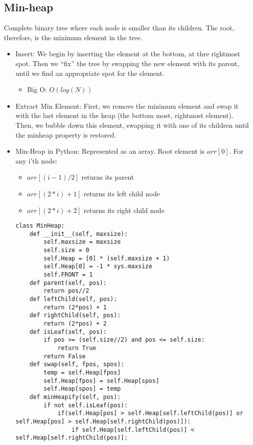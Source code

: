 \documentclass[a4paper, 11.25pt]{article}
\begin{document}
\subsection{Min-heap}
Complete binary tree where each node is smaller than its children. The root, therefore, is the minimum element in the tree. 
\begin{itemize}
    \item Insert: We begin by inserting the element at the bottom, at thre rightmost spot. Then we ``fix'' the tree by swapping the new element with its parent, until we find an appropriate spot for the element.
    \begin{itemize}
        \item Big O: $O(log(N))$
    \end{itemize}
    \item Extract Min Element: First, we remove the minimum element and swap it with the last element in the heap (the bottom most, rightmost element). Then, we bubble down this element, swapping it with one of its children until the minheap property is restored.
    \item Min-Heap in Python: Represented as an array. Root element is $arr[0]$. For any i'th node:
    \begin{itemize}
        \item $arr[(i-1)/2]$ returns its parent
        \item $arr[(2*i)+1]$ returns its left child node
        \item $arr[(2*i)+2]$ returns its right child node
    \end{itemize}
    \begin{lstlisting}[style=PythonStyle]
class MinHeap:
    def __init__(self, maxsize):
        self.maxsize = maxsize
        self.size = 0
        self.Heap = [0] * (self.maxsize + 1)
        self.Heap[0] = -1 * sys.maxsize
        self.FRONT = 1
    def parent(self, pos):
        return pos//2
    def leftChild(self, pos):
        return (2*pos) + 1
    def rightChild(self, pos):
        return (2*pos) + 2
    def isLeaf(self, pos):
        if pos >= (self.size//2) and pos <= self.size:
            return True
        return False
    def swap(self, fpos, spos):
        temp = self.Heap[fpos]
        self.Heap[fpos] = self.Heap[spos]
        self.Heap[spos] = temp
    def minHeapify(self, pos):
        if not self.isLeaf(pos):
            if(self.Heap[pos] > self.Heap[self.leftChild(pos)] or self.Heap[pos] > self.Heap[self.rightChild(pos)]):
                if self.Heap[self.leftChild(pos)] < self.Heap[self.rightChild(pos)]:

\end{lstlisting}
\end{itemize}
\end{document}
